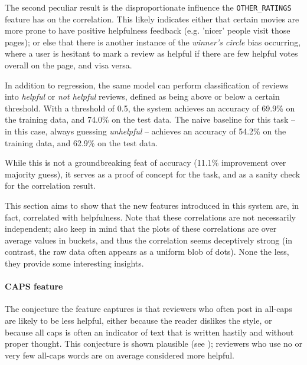 \documentclass[letter,10pt]{article}
\begin{document}
The second peculiar result is the disproportionate influence the
	{\tt OTHER\_RATINGS} feature has on the correlation.
This likely indicates either that certain movies are more prone
	to have positive helpfulness feedback (e.g. 'nicer' people
	visit those pages);
	or else that there is another instance of the {\em winner's circle}
	bias occurring, where a user is hesitant to mark a review as helpful
	if there are few helpful votes overall on the page, and visa versa.

In addition to regression, the same model can perform classification of
	reviews into {\em helpful} or {\em not helpful} reviews, defined
	as being above or below a certain threshold.
With a threshold of 0.5, the system achieves an accuracy of 69.9\% on the
	training data, and 74.0\% on the test data.
The naive baseline for this task -- in this case, always 
	guessing {\em unhelpful} -- achieves an accuracy of 54.2\% on 
	the training data, and 62.9\% on the test data.

While this is not a groundbreaking feat of  accuracy (11.1\% improvement
	over majority guess), it serves as a proof of concept for the task,
	and as a sanity check for the correlation result.



This section aims to show that the new features introduced in this system
	are, in fact, correlated with helpfulness. 
Note that these correlations are not necessarily independent;
	also keep in mind that the plots of these correlations are over
	average values in buckets, and thus the correlation seems
	deceptively strong (in contrast, the raw data often appears
	as a uniform blob of dots).
None the less, they provide some interesting insights.

\paragraph{CAPS feature}
The conjecture the feature captures is that reviewers who often post in 
	all-caps are likely to be less helpful, either because the reader
	dislikes the style, or because all caps is often an indicator
	of text that is written hastily and without proper thought.
This conjecture is shown plausible (see ); reviewers
	who use no or very few all-caps words are on average considered
	more helpful.
\end{document}
